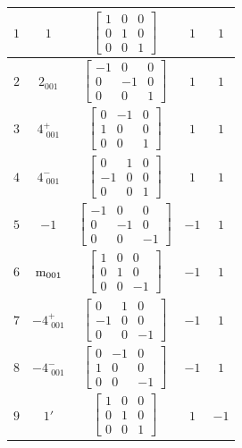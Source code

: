 \documentclass[fleqn,8pt]{jsarticle}
\begin{document}
\begin{longtable}{ccccc}
$ 1 $ & $ 1 $ & $ \begin{bmatrix} 1 & 0 & 0 \\ 0 & 1 & 0 \\ 0 & 0 & 1 \end{bmatrix} $ & $ 1 $ & $ 1 $ \\ \hline
$ 2 $ & $ 2{}_{001} $ & $ \begin{bmatrix} -1 & 0 & 0 \\ 0 & -1 & 0 \\ 0 & 0 & 1 \end{bmatrix} $ & $ 1 $ & $ 1 $ \\ \hline
$ 3 $ & $ 4^{+}_{\,\,001} $ & $ \begin{bmatrix} 0 & -1 & 0 \\ 1 & 0 & 0 \\ 0 & 0 & 1 \end{bmatrix} $ & $ 1 $ & $ 1 $ \\ \hline
$ 4 $ & $ 4^{-}_{\,\,001} $ & $ \begin{bmatrix} 0 & 1 & 0 \\ -1 & 0 & 0 \\ 0 & 0 & 1 \end{bmatrix} $ & $ 1 $ & $ 1 $ \\ \hline
$ 5 $ & $ -1 $ & $ \begin{bmatrix} -1 & 0 & 0 \\ 0 & -1 & 0 \\ 0 & 0 & -1 \end{bmatrix} $ & $ -1 $ & $ 1 $ \\ \hline
$ 6 $ & $ {\rm m}_{001} $ & $ \begin{bmatrix} 1 & 0 & 0 \\ 0 & 1 & 0 \\ 0 & 0 & -1 \end{bmatrix} $ & $ -1 $ & $ 1 $ \\ \hline
$ 7 $ & $ -4^{+}_{\,\,001} $ & $ \begin{bmatrix} 0 & 1 & 0 \\ -1 & 0 & 0 \\ 0 & 0 & -1 \end{bmatrix} $ & $ -1 $ & $ 1 $ \\ \hline
$ 8 $ & $ -4^{-}_{\,\,001} $ & $ \begin{bmatrix} 0 & -1 & 0 \\ 1 & 0 & 0 \\ 0 & 0 & -1 \end{bmatrix} $ & $ -1 $ & $ 1 $ \\ \hline
$ 9 $ & $ 1{}' $ & $ \begin{bmatrix} 1 & 0 & 0 \\ 0 & 1 & 0 \\ 0 & 0 & 1 \end{bmatrix} $ & $ 1 $ & $ -1 $ \\ \hline

\end{longtable}
\end{document}
